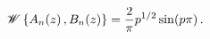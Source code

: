\[\mathop{\mathscr{W}\/}\nolimits\left\{\mathop{A_{n}\/}\nolimits\!\left(z\right%
),\mathop{B_{n}\/}\nolimits\!\left(z\right)\right\}=\frac{2}{\pi}p^{1/2}%
\mathop{\sin\/}\nolimits\!\left(p\pi\right).\]